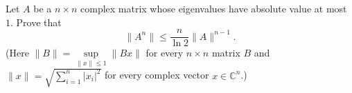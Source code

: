 Let \(A\) be a \(n\times n\) complex matrix whose eigenvalues have absolute value at most \(1\). Prove that \[ \|A^n\|\le \dfrac{n}{\ln 2} \|A\|^{n-1}. \](Here \(\|B\|=\sup\limits_{\|x\|\leq 1} \|Bx\|\) for every \(n\times n\) matrix \(B\) and \(\|x\|=\sqrt{\sum\limits_{i=1}^n |x_i|^2}\) for every complex vector \(x\in\mathbb{C}^n\).)